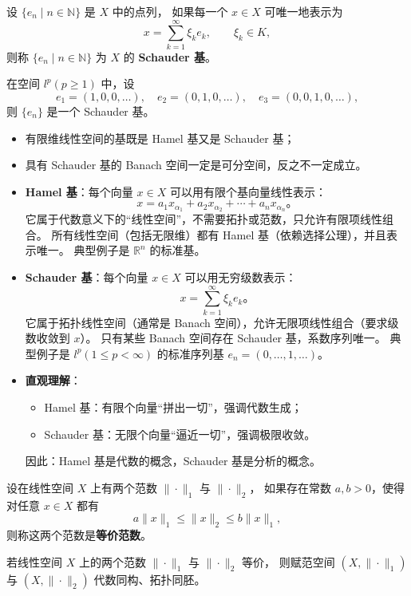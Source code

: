\begin{definition}
设 \(\{e_n\mid n\in\mathbb{N}\}\) 是 \(X\) 中的点列，  
如果每一个 \(x\in X\) 可唯一地表示为
\[
x=\sum_{k=1}^{\infty}\xi_k e_k,\qquad \xi_k\in K,
\]
则称 \(\{e_n\mid n\in\mathbb{N}\}\) 为 \(X\) 的 \textbf{Schauder 基}。
\end{definition}

\begin{example}
在空间 \(l^p(p\ge1)\) 中，设
\[
e_1=(1,0,0,\dots),\quad e_2=(0,1,0,\dots),\quad e_3=(0,0,1,0,\dots),
\]
则 \(\{e_n\}\) 是一个 Schauder 基。
\end{example}

\begin{remark}
\begin{itemize}
  \item 有限维线性空间的基既是 Hamel 基又是 Schauder 基；
  \item 具有 Schauder 基的 Banach 空间一定是可分空间，反之不一定成立。
\end{itemize}
\end{remark}
\begin{itemize}
  \item \textbf{Hamel 基}：每个向量 \(x\in X\) 可以用有限个基向量线性表示：
  \[
  x=a_1x_{\alpha_1}+a_2x_{\alpha_2}+\cdots+a_nx_{\alpha_n}。
  \]
  它属于代数意义下的“线性空间”，不需要拓扑或范数，只允许有限项线性组合。  
  所有线性空间（包括无限维）都有 Hamel 基（依赖选择公理），并且表示唯一。  
  典型例子是 \(\mathbb{R}^n\) 的标准基。

  \item \textbf{Schauder 基}：每个向量 \(x\in X\) 可以用无穷级数表示：
  \[
  x=\sum_{k=1}^{\infty}\xi_k e_k。
  \]
  它属于拓扑线性空间（通常是 Banach 空间），允许无限项线性组合（要求级数收敛到 \(x\)）。  
  只有某些 Banach 空间存在 Schauder 基，系数序列唯一。  
  典型例子是 \(l^p(1\le p<\infty)\) 的标准序列基 \(e_n=(0,\dots,1,\dots)\)。

  \item \textbf{直观理解}：
  \begin{itemize}
    \item Hamel 基：有限个向量“拼出一切”，强调代数生成；
    \item Schauder 基：无限个向量“逼近一切”，强调极限收敛。
  \end{itemize}
  因此：Hamel 基是代数的概念，Schauder 基是分析的概念。
\end{itemize}
\begin{definition}[等价范数]
设在线性空间 \(X\) 上有两个范数 \(\|\cdot\|_1\) 与 \(\|\cdot\|_2\)，  
如果存在常数 \(a,b>0\)，使得对任意 \(x\in X\) 都有
\[
a\|x\|_1 \le \|x\|_2 \le b\|x\|_1,
\]
则称这两个范数是\textbf{等价范数}。

若线性空间 \(X\) 上的两个范数 \(\|\cdot\|_1\) 与 \(\|\cdot\|_2\) 等价，  
则赋范空间 \((X,\|\cdot\|_1)\) 与 \((X,\|\cdot\|_2)\) 代数同构、拓扑同胚。
\end{definition}
